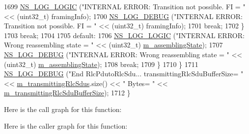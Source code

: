 \begin{DoxyCode}
1699                               \hyperlink{group__logging_ga88acd260151caf2db9c0fc84997f45ce}{NS\_LOG\_LOGIC} (\textcolor{stringliteral}{"INTERNAL ERROR: Transition not possible. FI = "} <<
       (uint32\_t) framingInfo);
1700                               \hyperlink{group__logging_ga413f1886406d49f59a6a0a89b77b4d0a}{NS\_LOG\_DEBUG} (\textcolor{stringliteral}{"INTERNAL ERROR: Transition not possible. FI = "} <<
       (uint32\_t) framingInfo);
1701                       \textcolor{keywordflow}{break};
1702                     \}
1703           \textcolor{keywordflow}{break};
1704 
1705           \textcolor{keywordflow}{default}:
1706                 \hyperlink{group__logging_ga88acd260151caf2db9c0fc84997f45ce}{NS\_LOG\_LOGIC} (\textcolor{stringliteral}{"INTERNAL ERROR: Wrong reassembling state = "} << (uint32\_t) 
      \hyperlink{classns3_1_1LteRlcAm_ab6d2954b419df60fc8f8df012fa2709c}{m\_assemblingState});
1707                 \hyperlink{group__logging_ga413f1886406d49f59a6a0a89b77b4d0a}{NS\_LOG\_DEBUG} (\textcolor{stringliteral}{"INTERNAL ERROR: Wrong reassembling state = "} << (uint32\_t) 
      \hyperlink{classns3_1_1LteRlcAm_ab6d2954b419df60fc8f8df012fa2709c}{m\_assemblingState});
1708           \textcolor{keywordflow}{break};
1709         \}
1710   \}
1711   \hyperlink{group__logging_ga413f1886406d49f59a6a0a89b77b4d0a}{NS\_LOG\_DEBUG} (\textcolor{stringliteral}{"End RlcPdutoRlcSdu... transmittingRlcSduBufferSize= "} << 
      \hyperlink{classns3_1_1LteRlcAm_a941fac42e27a28f35b0eea1a02c0595f}{m\_transmittingRlcSdus}.size() << \textcolor{stringliteral}{" Bytes= "} << 
      \hyperlink{classns3_1_1LteRlcAm_a27351db62caae50aabc6b23636a5e0dc}{m\_transmittingRlcSduBufferSize});
1712 \}
\end{DoxyCode}


Here is the call graph for this function\+:




Here is the caller graph for this function\+:


